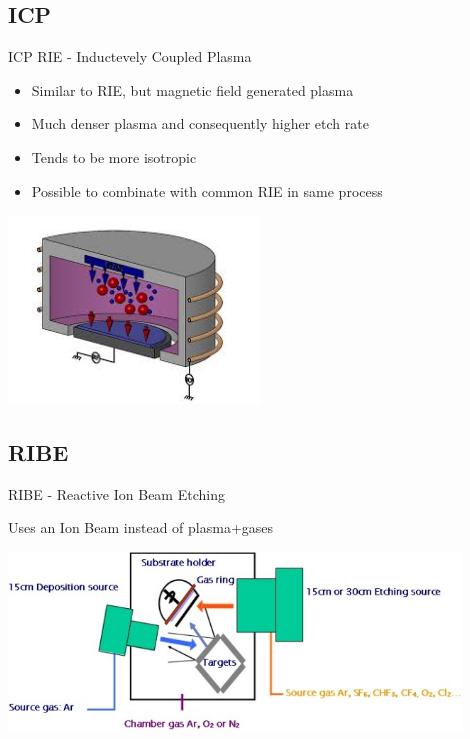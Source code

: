 \documentclass{beamer}
\begin{document}
\subsection{ICP}
\begin{frame}{ICP RIE - Inductevely Coupled Plasma}

    \begin{itemize}
    \item
	Similar to RIE, but magnetic field generated plasma
      \pause
    \item
	Much denser plasma and consequently higher etch rate
      \pause
    \item
	Tends to be more isotropic
    \item
Possible to combinate with common RIE in same process
\end{itemize}

\begin{center}
\includegraphics[width=0.5\textwidth]{icp.jpeg}
\end{center}

\end{frame}


\subsection{RIBE}
\begin{frame}{RIBE - Reactive Ion Beam Etching}

Uses an Ion Beam instead of plasma+gases

\begin{center}
\includegraphics[width=0.9\textwidth]{RIBE.jpg}
\end{center}

\end{frame}
\end{document}
